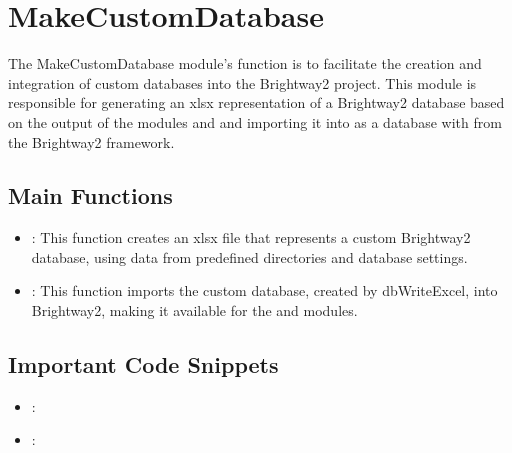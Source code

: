 \documentclass[letterpaper,10pt,english]{sphinxmanual}
\begin{document}
\sphinxstepscope


\section{MakeCustomDatabase}
\label{\detokenize{MakeCustomDatabase:makecustomdatabase}}\label{\detokenize{MakeCustomDatabase::doc}}
\sphinxAtStartPar
The MakeCustomDatabase module’s function is to facilitate the creation and integration of custom databases into the Brightway2 project. This module is responsible for generating an xlsx representation of a Brightway2 database based on the output of the modules  and  and importing it into as a database with  from the Brightway2 framework.


\subsection{Main Functions}
\label{\detokenize{MakeCustomDatabase:main-functions}}\begin{itemize}
\item {} 
\sphinxAtStartPar
{}: This function creates an xlsx file that represents a custom Brightway2 database, using data
from predefined directories and database settings.

\item {} 
\sphinxAtStartPar
{}: This function imports the custom database, created by dbWriteExcel, into Brightway2, making it
available for the  and  modules.

\end{itemize}


\subsection{Important Code Snippets}
\label{\detokenize{MakeCustomDatabase:important-code-snippets}}\begin{itemize}
\item {} 
\sphinxAtStartPar
{}:

\end{itemize}

\begin{sphinxVerbatim}[commandchars=\\\{\}]
  
\end{sphinxVerbatim}
\begin{itemize}
\item {} 
\sphinxAtStartPar
{}:

\end{itemize}
\end{document}
